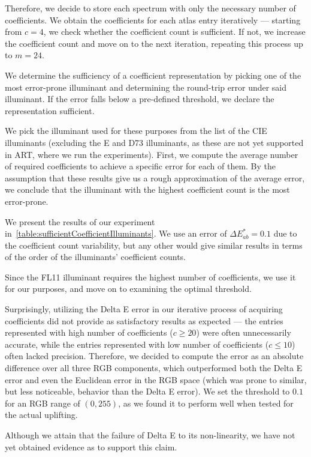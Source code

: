 Therefore, we decide to store each spectrum with only the necessary number of coefficients. We obtain the coefficients for each atlas entry iteratively --- starting from $c=4$, we check whether the coefficient count is sufficient. If not, we increase the coefficient count and move on to the next iteration, repeating this process up to $m=24$.

We determine the sufficiency of a coefficient representation by picking one of the most error-prone illuminant and determining the round-trip error under said illuminant. If the error falls below a pre-defined threshold, we declare the representation sufficient.

We pick the illuminant used for these purposes from the list of the CIE illuminants (excluding the E and D73 illuminants, as these are not yet supported in ART, where we run the experiments). First, we compute the average number of required coefficients to achieve a specific error for each of them. By the assumption that these results give us a rough approximation of the average error, we conclude that the illuminant with the highest coefficient count is the most error-prone.

We present the results of our experiment in~\cref{table:sufficientCoefficientIlluminants}. We use an error of $\Delta E_{ab}^*=0.1$ due to the coefficient count variability, but any other would give similar results in terms of the order of the illuminants' coefficient counts.

Since the FL11 illuminant requires the highest number of coefficients, we use it for our purposes, and move on to examining the optimal threshold.

Surprisingly, utilizing the Delta E error in our iterative process of acquiring coefficients did not provide as satisfactory results as expected --- the entries represented with high number of coefficients ($c \ge 20$) were often unnecessarily accurate, while the entries represented with low number of coefficients ($c \le 10$) often lacked precision. Therefore, we decided to compute the error as an  absolute difference over all three RGB components, which outperformed both the Delta E error and even the Euclidean error in the RGB space (which was prone to similar, but less noticeable, behavior than the Delta E error). We set the threshold to $0.1$ for an RGB range of $(0,255)$, as we found it to perform well when tested for the actual uplifting. 

Although we attain that the failure of Delta E to its non-linearity, we have not yet obtained evidence as to support this claim.

